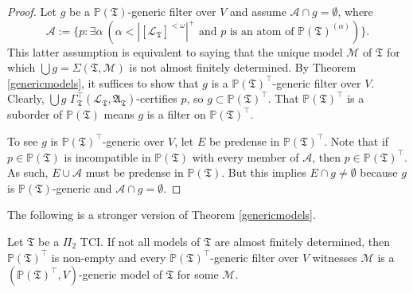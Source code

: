 \documentclass[12pt]{article}
\numberwithin{equation}{section}
\begin{document}
\begin{proof}
Let $g$ be a $\mathbb{P}(\mathfrak{T})$-generic filter over $V$ and assume $\mathcal{A} \cap g = \emptyset$, where $$\mathcal{A} := \{p : \exists \alpha \ (\alpha < |[\mathcal{L}_{\mathfrak{T}}]^{< \omega}|^+ \text{ and } p \text{ is an atom of } \mathbb{P}(\mathfrak{T})^{(\alpha)})\}.$$ This latter assumption is equivalent to saying that the unique model $\mathcal{M}$ of $\mathfrak{T}$ for which $\bigcup g = \Sigma(\mathfrak{T}, \mathcal{M})$ is not almost finitely determined. By Theorem \ref{genericmodels}, it suffices to show that $g$ is a $\mathbb{P}(\mathfrak{T})^{\top}$-generic filter over $V$. Clearly, $\bigcup g$ $\Gamma_{\mathfrak{T}}^{\top} (\mathcal{L}_{\mathfrak{T}}, \mathfrak{A}_{\mathfrak{T}})$-certifies $p$, so $g \subset \mathbb{P}(\mathfrak{T})^{\top}$. That $\mathbb{P}(\mathfrak{T})^{\top}$ is a suborder of $\mathbb{P}(\mathfrak{T})$ means $g$ is a filter on $\mathbb{P}(\mathfrak{T})^{\top}$.

To see $g$ is $\mathbb{P}(\mathfrak{T})^{\top}$-generic over $V$, let $E$ be predense in $\mathbb{P}(\mathfrak{T})^{\top}$. Note that if $p \in \mathbb{P}(\mathfrak{T})$ is incompatible in $\mathbb{P}(\mathfrak{T})$ with every member of $\mathcal{A}$, then $p \in \mathbb{P}(\mathfrak{T})^{\top}$. As such, $E \cup \mathcal{A}$ must be predense in $\mathbb{P}(\mathfrak{T})$. But this implies $E \cap g \neq \emptyset$ because $g$ is $\mathbb{P}(\mathfrak{T})$-generic and $\mathcal{A} \cap g = \emptyset$.
\end{proof}

The following is a stronger version of Theorem \ref{genericmodels}.

\begin{thm}\label{genericdichom}
Let $\mathfrak{T}$ be a $\Pi_2$ TCI. If not all models of $\mathfrak{T}$ are almost finitely determined, then $\mathbb{P}(\mathfrak{T})^{\top}$ is non-empty and every $\mathbb{P}(\mathfrak{T})^{\top}$-generic filter over $V$ witnesses $\mathcal{M}$ is a $(\mathbb{P}(\mathfrak{T})^{\top}, V)$-generic model of $\mathfrak{T}$ for some $\mathcal{M}$.
\end{thm}
\end{document}

